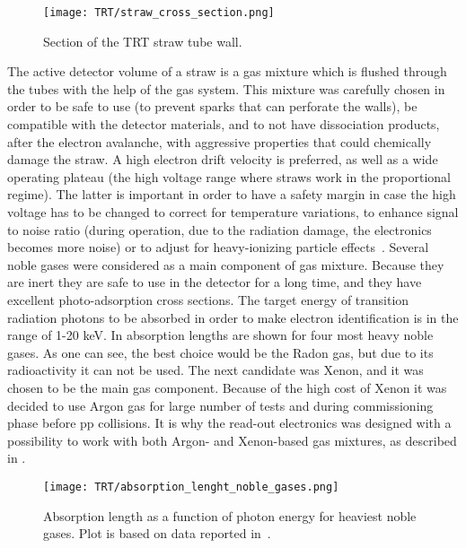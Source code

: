 \begin{figure}
\centering
\texttt{[image: TRT/straw\_cross\_section.png]}
\caption{ 
Section of the TRT straw tube wall.
}
\label{fig:straw_wall_section}
\end{figure}

The active detector volume of a straw is a gas mixture which is flushed through the tubes with the help of the gas system.
This mixture was carefully chosen in order to be safe to use (to prevent sparks that can perforate the walls), be compatible with the detector materials, and to not have dissociation products, after the electron avalanche, with aggressive properties that could chemically damage the straw.
A high electron drift velocity is preferred, as well as a wide operating plateau (the high voltage range where straws work in the proportional regime). 
The latter is important in order to have a
safety margin in case the high voltage has to be changed to correct for temperature variations, to enhance signal to noise ratio (during operation, due to the radiation damage, the electronics becomes more noise) or to adjust for 
heavy-ionizing particle effects~\cite{Abat:2008zza}.
Several noble gases were considered as a main component of gas mixture. Because they are inert they are safe to use in the detector for a long time, and they have 
excellent photo-adsorption cross sections.
The target energy of transition radiation photons to be absorbed in order to make electron identification is in the range of 1-20 keV.
In  absorption lengths are shown for four most heavy noble gases.
As one can see, the best choice would be the Radon gas, but due to its radioactivity it can not be used.
The next candidate was Xenon, and it was chosen to be the main gas component.
Because of the high cost of Xenon it was decided to use Argon gas for large number of tests and during commissioning phase before pp collisions. It is why the read-out electronics was
designed with a possibility to work with both Argon- and Xenon-based gas mixtures, as described in .

\begin{figure}
\centering
\texttt{[image: TRT/absorption\_lenght\_noble\_gases.png]}
\caption{ 
  Absorption length as a function of photon energy for heaviest noble gases. Plot is based on data reported in~\cite{Hubbell:353989}.
}
\label{fig:absorption_lenght}
\end{figure}


